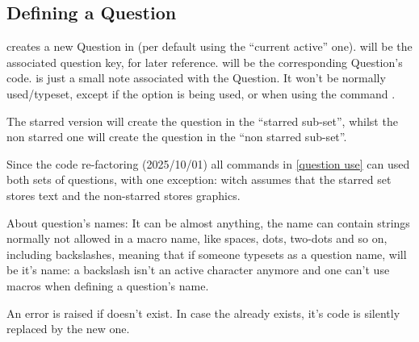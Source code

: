 \documentclass[10pt]{article}
\begin{document}
\subsection{Defining a Question}\label{question definition}
\begin{codedescribe}{}
\begin{codesyntax}%
\end{codesyntax}
 creates a new Question in  (per default using the ``current active'' one).  will be the associated question key, for later reference.  will be the corresponding Question's code.  is just a small note associated with the Question. It won't be normally used/typeset, except if the  option is being used, or when using the command \tsobj{\QuestionsList}.

The starred version  will create the question in the ``starred sub-set'', whilst the non starred one  will create the question in the ``non starred sub-set''. 
\end{codedescribe}
\begin{tsremark}
  Since the code re-factoring (2025/10/01) all commands in \ref{question use} can used both sets of questions, with one exception: \tsobj{\QuestionsList} witch assumes that the starred set stores text and the non-starred stores  graphics.
\end{tsremark}
\begin{tsremark}
About question's names: It can be almost anything, the name can contain strings normally not allowed in a macro name, like spaces, dots, two-dots and so on, including backslashes, meaning that if someone typesets \tsobj{\XYZ} as a question name, \tsobj{\XYZ} will be it's name: a backslash isn't an active character anymore and one can't use macros when defining a question's name.
\end{tsremark}

\begin{tsremark}
An error is raised if  doesn't exist. In case the  already exists, it's code is silently replaced by the new one.
\end{tsremark}
\end{document}
